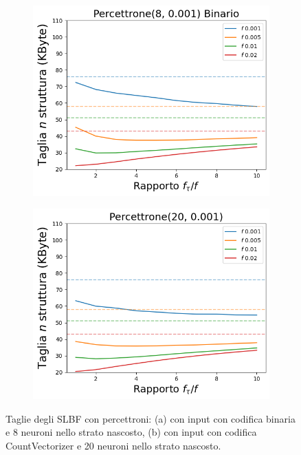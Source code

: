\documentclass[../../main.tex]{subfiles}
\begin{document}
    \begin{figure}[H]
        \centering
        \begin{subfigure}[b]{0.48\textwidth}
            \centering
            \includegraphics[width=\textwidth]{immagini/7/SLBF/Percettrone(8, 0.001) Binario_Taglia.png}
            \caption{}
        \end{subfigure}
        \begin{subfigure}[b]{0.48\textwidth}
            \centering
            \includegraphics[width=\textwidth]{immagini/7/SLBF/Percettrone(20, 0.001)_Taglia.png}
            \caption{}  
        \end{subfigure}
        \caption{Taglie degli SLBF con percettroni: (a) con input con codifica binaria e 8 neuroni nello strato nascosto, (b) con input con codifica CountVectorizer e 20 neuroni nello strato nascosto.}
        \label{fig:tagliePercettroniBinSLBF}
    \end{figure}
\end{document}
